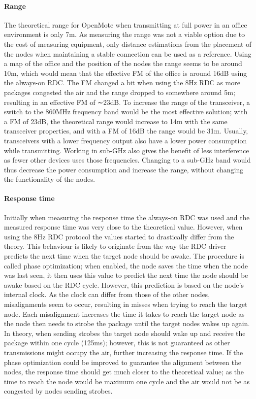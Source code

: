 \paragraph{Range}

The theoretical range for OpenMote when transmitting at full power in an office environment is only 7m.
As measuring the range was not a viable option due to the cost of measuring equipment,
	only distance estimations from the placement of the nodes when maintaining a stable connection can be used as a reference.
Using a map of the office and the position of the nodes the range seems to be around 10m,
	which would mean that the effective FM of the office is around 16dB using the always-on RDC.
The FM changed a bit when using the 8Hz RDC as more packages congested the air and the range dropped to somewhere around 5m;
	resulting in an effective FM of ∼23dB.
To increase the range of the transceiver,
	a switch to the 860MHz frequency band would be the most effective solution;
	with a FM of 23dB,
	the theoretical range would increase to 14m with the same transceiver properties,
	and with a FM of 16dB the range would be 31m.
Usually,
	transceivers with a lower frequency output also have a lower power consumption while transmitting.
Working in sub-GHz also gives the benefit of less interference as fewer other devices uses those frequencies.
Changing to a sub-GHz band would thus decrease the power consumption and increase the range,
	without changing the functionality of the nodes.

\paragraph{Response time}

Initially when measuring the response time the always-on RDC was used and the measured response time was very close to the theoretical value.
However,
	when using the 8Hz RDC protocol the values started to drastically differ from the theory.
This behaviour is likely to originate from the way the RDC driver predicts the next time when the target node should be awake.
The procedure is called phase optimization;
	when enabled,
	the node saves the time when the node was last seen,
	it then uses this value to predict the next time the node should be awake based on the RDC cycle.
However,
	this prediction is based on the node’s internal clock.
As the clock can differ from those of the other nodes,
	misalignments seem to occur,
	resulting in misses when trying to reach the target node.
Each misalignment increases the time it takes to reach the target node as the node then needs to strobe the package until the target nodes wakes up again.
In theory,
	when sending strobes the target node should wake up and receive the package within one cycle (125ms);
	however,
	this is not guaranteed as other transmissions might occupy the air,
	further increasing the response time.
If the phase optimization could be improved to guarantee the alignment between the nodes,
	the response time should get much closer to the theoretical value;
	as the time to reach the node would be maximum one cycle and the air would not be as congested by nodes sending strobes.


